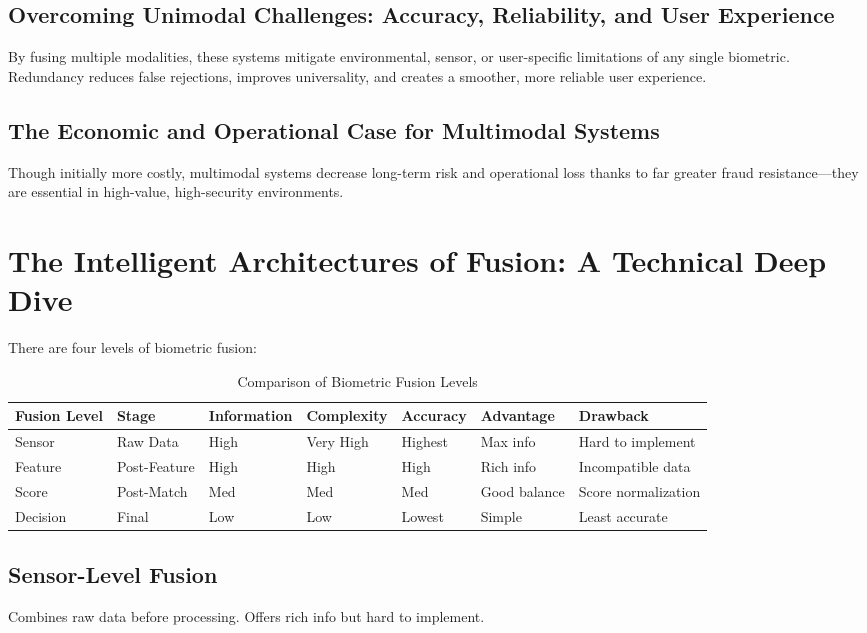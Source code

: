 \subsection{Overcoming Unimodal Challenges: Accuracy, Reliability, and User Experience}
By fusing multiple modalities, these systems mitigate environmental, sensor, or user-specific limitations of any single biometric. Redundancy reduces false rejections, improves universality, and creates a smoother, more reliable user experience.

\subsection{The Economic and Operational Case for Multimodal Systems}
Though initially more costly, multimodal systems decrease long-term risk and operational loss thanks to far greater fraud resistance—they are essential in high-value, high-security environments.

\section{The Intelligent Architectures of Fusion: A Technical Deep Dive}

There are four levels of biometric fusion:
\begin{table}[h]
\centering
\caption{Comparison of Biometric Fusion Levels}
\begin{tabular}{|l|l|l|l|l|l|l|}
\hline
\textbf{Fusion Level} & \textbf{Stage} & \textbf{Information} & \textbf{Complexity} & \textbf{Accuracy} & \textbf{Advantage} & \textbf{Drawback} \\
\hline
Sensor      & Raw Data  & High  & Very High & Highest    & Max info   & Hard to implement \\
Feature     & Post-Feature & High & High & High & Rich info      & Incompatible data \\
Score       & Post-Match  & Med  & Med & Med & Good balance   & Score normalization \\
Decision    & Final      & Low   & Low & Lowest     & Simple        & Least accurate \\
\hline
\end{tabular}
\end{table}

\subsection{Sensor-Level Fusion}
Combines raw data before processing. Offers rich info but hard to implement.

